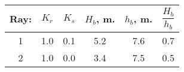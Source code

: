 \begin{tabular}{cccccc}
Ray: & $K_{r}$ & $K_{s}$ & $H_{b}$, m. & $h_{b}$, m. & $\dfrac{H_{b}}{h_{b}}$ \\
\hline
1 & 1.0 & 0.1 & 5.2 & 7.6 & 0.7 \\
2 & 1.0 & 0.0 & 3.4 & 7.5 & 0.5 \\
\hline
\end{tabular}
